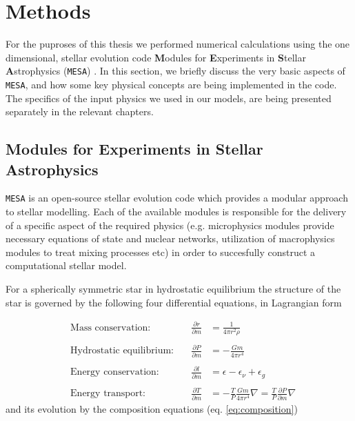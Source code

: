 \documentclass[../../main/thesis_msc.tex]{subfiles}
\begin{document}
    \chapter{Methods}
    
    	For the puproses of this thesis we performed numerical calculations using the one dimensional, stellar evolution code \textbf{M}odules for \textbf{E}xperiments in \textbf{S}tellar \textbf{A}strophysics (\texttt{MESA}) \citep{Paxton2011, Paxton:2013pj, Paxton2015, Paxton2018}. In this section, we briefly discuss the very basic aspects of \texttt{MESA}, and how some key physical concepts are being implemented in the code. The specifics of the input physics we used in our models, are being presented separately in the relevant chapters.
    	
    		\section{Modules for Experiments in Stellar Astrophysics}
    		
    			
    			\texttt{MESA} is an open-source stellar evolution code which provides a modular approach to stellar modelling. Each of the available modules is responsible for the delivery of a specific aspect of the required physics (e.g. microphysics modules provide necessary equations of state and nuclear networks, utilization of macrophysics modules to treat mixing processes etc) in order to succesfully construct a computational stellar model.
    			
    			For a spherically symmetric star in hydrostatic equilibrium the structure of the star is governed by the following four differential equations, in Lagrangian form
    			
    			\begin{align} 
    				&\textrm{Mass conservation:} &\quad \frac{\partial r}{\partial m} &= \frac{1}{4 \pi r^2 \rho} \label{eq:2.1} \\ \nonumber \\
					&\textrm{Hydrostatic equilibrium:} &\quad \frac{\partial P}{\partial m} &= - \frac{G m}{4 \pi r^4} \\ \nonumber \\
					&\textrm{Energy conservation:} &\quad \frac{\partial l}{\partial m} &= \epsilon - \epsilon_{\nu} + \epsilon_g \\ \nonumber \\
					&\textrm{Energy transport:} &\quad \frac{\partial T}{\partial m} &= - \frac{T}{P} \frac{G m}{4 \pi r^4} \nabla  = \frac{T}{P} \frac{\partial P}{\partial m} \nabla \label{eq:2.4}
				\end{align}
				and its evolution by the composition equations (eq. \ref{eq:composition})
				
\end{document}

